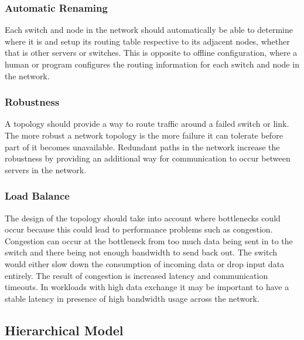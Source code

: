 \documentclass[12pt]{article}
\begin{document}
\subsubsection{Automatic Renaming} \label{ssub:auto-renaming}

Each switch and node in the network should automatically be able to determine where it is and setup its routing table respective to its adjacent nodes, whether that is other servers or switches. This is opposite to offline configuration, where a human or program configures the routing information for each switch and node in the network.


\subsubsection{Robustness} \label{ssub:net-robustness}

A topology should provide a way to route traffic around a failed switch or link. The more robust a network topology is the more failure it can tolerate before part of it becomes unavailable. Redundant paths in the network increase the robustness by providing an additional way for communication to occur between servers in the network.


\subsubsection{Load Balance} \label{ssub:net-load-balance}

The design of the topology should take into account where bottlenecks could occur because this could lead to performance problems such as congestion. Congestion can occur at the bottleneck from too much data being sent in to the switch and there being not enough bandwidth to send back out. The switch would either slow down the consumption of incoming data or drop input data entirely. The result of congestion is increased latency and communication timeouts. In workloads with high data exchange it may be important to have a stable latency in presence of high bandwidth usage across the network.





\subsection{Hierarchical Model} \label{sub:net-hierarchical}
\end{document}
